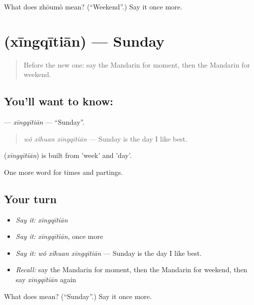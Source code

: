 \begin{tcolorbox}[breakable,colback=teal!4,colframe=teal!35!black,title={Before you move on}]
What does zhōumò mean? (\textquotedblleft{}Weekend\textquotedblright{}.) Say it once more.
\end{tcolorbox}
\section[\texorpdfstring{\zh{星期天} (xīngqītiān)}{星期天 (xīngqītiān)}]{ (xīngqītiān) — Sunday}

\label{lesson:ZH-C46-xingqitian}



\begin{quote}
Before the new one: say the Mandarin for moment, then the Mandarin for weekend.
\end{quote}

\subsection*{You'll want to know: }
\textbf{} — \emph{xīngqītiān} — \textquotedblleft{}Sunday\textquotedblright{}.

\begin{quote}
\textbf{} \emph{wǒ xǐhuan xīngqītiān} — Sunday is the day I like best.
\end{quote}

\begin{cousinweb}
\textbf{} (\emph{xīngqītiān}) is built from  'week' and  'day'.
\end{cousinweb}

\begin{grammarlens}[title={What you've built}]
One more word for times and partings.
\end{grammarlens}

\subsection*{Your turn}
\begin{itemize}
\raggedright
  \item \emph{Say it:} \emph{xīngqītiān}
  \item \emph{Say it:} \emph{xīngqītiān}, once more
  \item \emph{Say it:} \emph{wǒ xǐhuan xīngqītiān} — Sunday is the day I like best.
  \item \emph{Recall:} say the Mandarin for moment, then the Mandarin for weekend, then say \emph{xīngqītiān} again
\end{itemize}

\begin{tcolorbox}[breakable,colback=teal!4,colframe=teal!35!black,title={Before you move on}]
What does  mean? (\textquotedblleft{}Sunday\textquotedblright{}.) Say it once more.
\end{tcolorbox}
